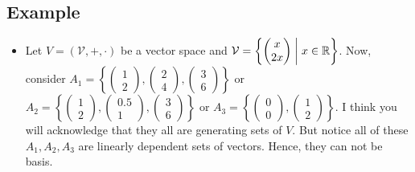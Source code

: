 \documentclass{article}
\newcommand{\suchthat}{\;\ifnum\currentgrouptype=16 \middle\fi|\;}%
\begin{document}
\subsection{Example}
\begin{itemize}
    \item Let \(V =(\mathcal{V},+,\cdot)\) be a vector space and \( \mathcal{V}= \left\{ 
    \begin{pmatrix}
    x\\2x
    \end{pmatrix} \suchthat x \in \mathbb{R}
    \right\}\). Now, consider \(A_1 = \left\{
\begin{pmatrix}
1\\2
\end{pmatrix}
,
\begin{pmatrix}
2\\4
\end{pmatrix}
,\begin{pmatrix}
3\\6
\end{pmatrix}\right\}\) or \({A_2} = \left\{
\begin{pmatrix}
1\\2
\end{pmatrix},
\begin{pmatrix}
0.5\\1
\end{pmatrix}
,\begin{pmatrix}
3\\6
\end{pmatrix}\right\}\) or \({A_3} = \left\{
\begin{pmatrix}
0\\0
\end{pmatrix},
\begin{pmatrix}
1\\2
\end{pmatrix}\right\}\). I think you will acknowledge that they all are generating sets of $V$. But notice all of these ${A_1},{A_2},{A_3}$ are linearly dependent sets of vectors. Hence, they can not be basis.\\


\end{itemize}
\end{document}
